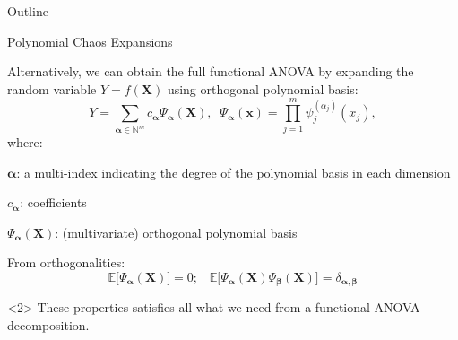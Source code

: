 \documentclass[english,aspectratio=169]{beamer}
\let\tempone\itemize
\let\temptwo\enditemize
\renewenvironment{itemize}{\tempone\addtolength{\itemsep}{0.35\baselineskip}}{\temptwo}
\begin{document}
\begin{frame}{Outline}
  \tableofcontents[currentsubsection]
\end{frame}

\begin{frame}[fragile]{Polynomial Chaos Expansions}
\small

Alternatively, we can obtain the full functional ANOVA by expanding the random variable $Y = f(\bm{X})$
using orthogonal polynomial basis:
\begin{equation*}
  Y = \sum_{\bm{\alpha} \in \mathbb{N}^m} c_{\bm{\alpha}} \Psi_{\bm{\alpha}} (\bm{X}),\;\; \Psi_{\bm{\alpha}} (\bm{x}) = \prod_{j = 1}^m \psi_j^{(\alpha_j)} (x_j),
\end{equation*}
where:
\begin{itemize}
  \item $\bm{\alpha}$: a multi-index indicating the degree of the polynomial basis in each dimension
  \item $c_{\bm{\alpha}}$: coefficients
  \item $\Psi_{\bm{\alpha}} (\bm{X})$: (multivariate) orthogonal polynomial basis
\end{itemize}

\vspace{0.5em}

From orthogonalities:
\begin{equation*}
  \mathbb{E}\mathbb[\Psi_{\bm{\alpha}} (\bm{X})] = 0;\;\;\; \mathbb{E}\mathbb[\Psi_{\bm{\alpha}} (\bm{X}) \Psi_{\bm{\beta}} (\bm{X})] = \delta_{\bm{\alpha}, \bm{\beta}} 
\end{equation*}

\begin{exampleblock}<2>{}
  \centering
  These properties satisfies all what we need from a functional ANOVA decomposition.
\end{exampleblock}

\end{frame}
\end{document}

